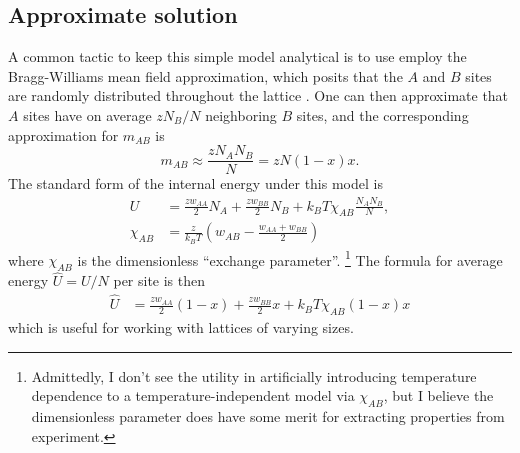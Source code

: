 \documentclass[10pt]{article}
\begin{document}
\subsection{Approximate solution}
A common tactic to keep this simple model analytical is to use employ the Bragg-Williams mean field approximation, which posits that the $A$ and $B$ sites are randomly distributed throughout the lattice \cite{flory}.
One can then approximate that $A$ sites have on average $z N_B / N$ neighboring $B$ sites, and the corresponding approximation for $m_{AB}$ is
\begin{equation}
    m_{AB} \approx \frac{z N_A N_B}{N} = z N (1-x) x.
\end{equation}
The standard form of the internal energy under this model is
\begin{align}
    U &=
    \frac{z w_{AA}}{2} N_A +
    \frac{z w_{BB}}{2} N_B +
    k_B T \chi_{AB} \frac{N_A N_B}{N}, \\
    \chi_{AB} &=
    \frac{z}{k_B T} \left( w_{AB} - \frac{w_{AA} + w_{BB}}{2} \right)
    \label{eqn:BW_solution}
\end{align}
where $\chi_{AB}$ is the dimensionless ``exchange parameter''. \footnote{Admittedly, I don't see the utility in artificially introducing temperature dependence to a temperature-independent model via $\chi_{AB}$, but I believe the dimensionless parameter does have some merit for extracting properties from experiment.}
The formula for average energy $\hat{U}=U/N$ per site is then
\begin{align}
    \hat{U} &=
    \frac{z w_{AA}}{2} (1-x) +
    \frac{z w_{BB}}{2} x +
    k_B T \chi_{AB} (1-x) x
\end{align}
which is useful for working with lattices of varying sizes.
\end{document}
